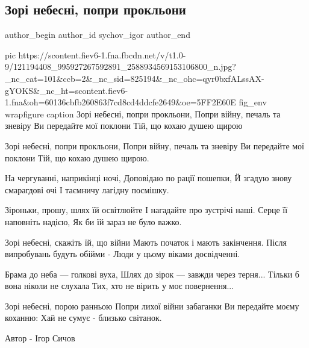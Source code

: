  
 
 
 
 

\subsection{Зорі небесні, попри прокльони}

\ifcmt
  author_begin
   author_id sychov_igor
  author_end
\fi

\ifcmt
pic https://scontent.fiev6-1.fna.fbcdn.net/v/t1.0-9/121194408_995927267592891_2588934569153106800_n.jpg?_nc_cat=101&ccb=2&_nc_sid=825194&_nc_ohc=qyr0bxfALssAX-gYOKS&_nc_ht=scontent.fiev6-1.fna&oh=60136cbfb260863f7cd8cd4ddcfe2649&oe=5FF2E60E
fig_env wrapfigure
caption Зорі небесні, попри прокльони, Попри війну, печаль та зневіру Ви передайте мої поклони Тій, що кохаю душею щирою
\fi

\obeycr
Зорі небесні, попри прокльони,
Попри війну, печаль та зневіру
Ви передайте мої поклони
Тій, що кохаю душею щирою.

На чергуванні, наприкінці ночі,
Доповідаю по рації пошепки,
Й згадую знову смарагдові очі
І таємничу лагідну посмішку.

Зіроньки, прошу, шлях їй освітлюйте
І нагадайте про зустрічі наші.
Серце її наповніть надією,
Як би їй зараз не було важко.

Зорі небесні, скажіть їй, що війни
Мають початок і мають закінчення.
Після випробувань будуть обійми -
Люди у цьому віками досвідченні.

Брама до неба — голкові вуха,
Шлях до зірок — завжди через терня...
Тільки б вона ніколи не слухала
Тих, хто не вірить у моє повернення...

Зорі небесні, порою ранньою
Попри лихої війни забаганки
Ви передайте моєму коханню:
Хай не сумує - близько світанок.

Автор - Ігор Сичов
\restorecr
